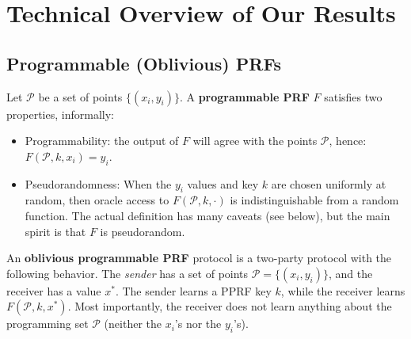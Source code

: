 \section{Technical Overview of Our Results}
\label{sect:overview}

\subsection{Programmable (Oblivious) PRFs}

\renewcommand{\P}{\mathcal{P}}

Let $\P$ be a set of points $\{ (x_i, y_i) \}$. A {\bf programmable PRF} $F$ satisfies two properties, informally:
\begin{itemize}
    \item Programmability: the output of $F$ will agree with the points $\P$, hence: $F(\P,k, x_i) = y_i$.
    \item Pseudorandomness: When the $y_i$ values and key $k$ are chosen uniformly at random, then oracle access to $F(\P,k, \cdot)$ is indistinguishable from a random function. The actual definition has many caveats (see below), but the main spirit is that $F$ is pseudorandom.
\end{itemize}

An {\bf oblivious programmable PRF} protocol is a two-party protocol with the following behavior. The {\em sender} has a set of points $\P = \{ (x_i, y_i) \}$, and the receiver has a value $x^*$. The sender learns a PPRF key $k$, while the receiver learns $F(\P,k,x^*)$. Most importantly, the receiver does not learn anything about the programming set $\P$ (neither the $x_i$'s nor the $y_i$'s).

